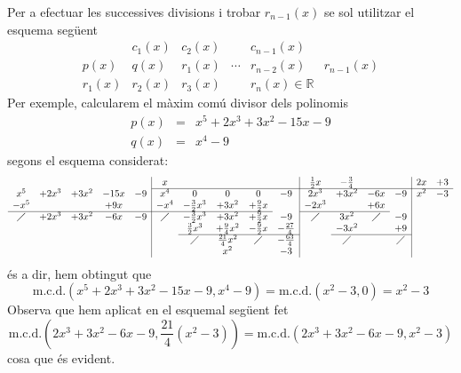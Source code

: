 Per a efectuar les successives divisions i trobar $r_{n-1}(x)$ se sol
utilitzar el esquema següent\begin{equation*}
\begin{array}{c|c|c|c|c|c}
& c_{1}(x) & c_{2}(x) & & c_{n-1}(x) & \\ \hline
p(x) & q(x) & r_{1}(x) & \cdots & r_{n-2}(x) & r_{n-1}(x) \\ \hline
r_{1}(x) & r_{2}(x) & r_{3}(x) & & r_{n}(x)\in \mathbb{R} &
\end{array}\end{equation*}Per exemple, calcularem el màxim comú divisor dels polinomis\begin{eqnarray*}
p(x) &=&x^{5}+2x^{3}+3x^{2}-15x-9 \\
q(x) &=&x^{4}-9
\end{eqnarray*}segons el esquema considerat:\begin{equation*}
\begin{array}{ccccc|ccccc|cccc|cc}
& & & & & x & & & & & \frac{1}{2}x & -\frac{3}{4} & & & 2x & +3 \\
\cline{6-16}
x^{5} & +2x^{3} & +3x^{2} & -15x & -9 & x^{4} & 0 & 0 & 0 & -9 & 2x^{3} &
+3x^{2} & -6x & -9 & x^{2} & -3 \\
-x^{5} & & & +9x & & -x^{4} & -\frac{3}{2}x^{3} & +3x^{2} & +\frac{9}{2}x
& & -2x^{3} & & +6x & & & \\ \cline{1-5}\cline{6-9}\cline{11-13}
\diagup & +2x^{3} & +3x^{2} & -6x & -9 & \diagup & -\frac{3}{2}x^{3} &
+3x^{2} & +\frac{9}{2}x & -9 & \diagup & 3x^{2} & \diagup & -9 & & \\
& & & & & & \frac{3}{2}x^{3} & +\frac{9}{4}x^{2} & -\frac{9}{2}x & -\frac{27}{4} & & -3x^{2} & & +9 & & \\ \cline{7-10}\cline{12-14}
& & & & & & \diagup & \frac{21}{4}x^{2} & \diagup & -\frac{63}{4} & &
\diagup & & \diagup & & \\
& & & & & & & x^{2} & & -3 & & & & & &
\end{array}\end{equation*}és a dir, hem obtingut que\begin{equation*}
\text{m.c.d.}\left( x^{5}+2x^{3}+3x^{2}-15x-9,x^{4}-9\right) =\text{m.c.d.}\left( x^{2}-3,0\right) =x^{2}-3
\end{equation*}Observa que hem aplicat en el esquemal següent fet\begin{equation*}
\text{m.c.d.}\left( 2x^{3}+3x^{2}-6x-9,\frac{21}{4}(x^{2}-3)\right) =\text{m.c.d.}\left( 2x^{3}+3x^{2}-6x-9,x^{2}-3\right)
\end{equation*}cosa que és evident.

